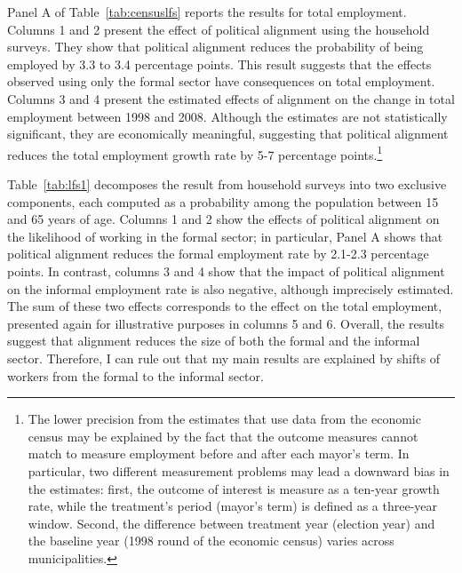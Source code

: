 \documentclass[dv_diss_main.tex]{subfiles}
\begin{document}
Panel A of Table~\ref{tab:censuslfs} reports the results for total employment. Columns 1 and 2 present the effect of political alignment using the household surveys. They show that political alignment reduces the probability of being employed by 3.3 to 3.4 percentage points. This result suggests that the effects observed using only the formal sector have consequences on total employment. Columns 3 and 4 present the estimated  effects of alignment on the change in total employment between 1998 and 2008. Although the estimates are not statistically significant, they are economically meaningful, suggesting that political alignment reduces the total employment growth rate by 5-7 percentage points.\footnote{The lower precision from the estimates that use data from the economic census may be explained by the fact that the outcome measures cannot match to measure employment before and after each mayor's term. In particular, two different measurement problems may lead a downward bias in the estimates: first, the outcome of interest is measure as a ten-year growth rate, while the treatment's period (mayor's term) is defined as a three-year window. Second, the difference between treatment year (election year) and the baseline year (1998 round of the economic census) varies across municipalities.}

Table~\ref{tab:lfs1} decomposes the result from household surveys into two exclusive components, each computed as a probability among the population between 15 and 65 years of age. Columns 1 and 2 show the effects of political alignment on the likelihood of working in the formal sector; in particular, Panel A shows that political alignment reduces the formal employment rate by 2.1-2.3 percentage points. In contrast, columns 3 and 4 show that the impact of political alignment on the informal employment rate is also negative, although imprecisely estimated. The sum of these two effects corresponds to the effect on the total employment, presented again for illustrative purposes in columns 5 and 6. Overall, the results suggest that alignment reduces the size of both the formal and the informal sector. Therefore, I can rule out that my main results are explained by shifts of workers from the formal to the informal sector. 
\end{document}
